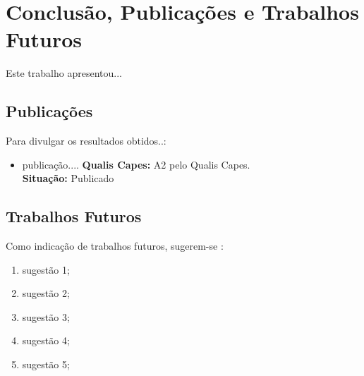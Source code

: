 
\chapter{Conclusão, Publicações e Trabalhos Futuros}

Este trabalho apresentou...

\section{Publicações}

Para divulgar os resultados obtidos..:
\begin{itemize}
    \item publicação....
    \textbf{Qualis Capes:} A2 pelo Qualis Capes.\\
    \textbf{Situação:} Publicado
\end{itemize}

\section{Trabalhos Futuros}

Como indicação de trabalhos futuros, sugerem-se :

\begin{enumerate}
    \item sugestão 1;
    
    \item sugestão 2;
    
    \item sugestão 3;
    
    \item sugestão 4;
    
    \item sugestão 5;
\end{enumerate}

